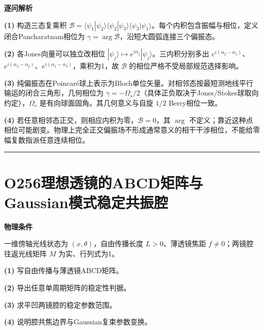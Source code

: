 \documentclass[UTF8,a4paper,11pt,oneside,openany]{ctexbook}
\begin{document}
\par\medskip\noindent\textbf{逐问解析}
\par\noindent\textbf{(1)} 构造三态复乘积 \(\mathcal B=\langle\psi_1|\psi_2\rangle\langle\psi_2|\psi_3\rangle\langle\psi_3|\psi_1\rangle\)。每个内积包含振幅与相位，定义闭合Pancharatnam相位为 \(\gamma=\arg\mathcal B\)，沿短大圆弧连接三个偏振态。
\par\noindent\textbf{(2)} 各Jones向量可以独立改相位 \(|\psi_j\rangle\mapsto e^{i\alpha_j}|\psi_j\rangle\)。三内积分别多出 \(e^{i(\alpha_2-\alpha_1)}\)、\(e^{i(\alpha_3-\alpha_2)}\)、\(e^{i(\alpha_1-\alpha_3)}\)，乘积为1，故 \(\mathcal B\) 的相位严格不受局部规范选择影响。
\par\noindent\textbf{(3)} 纯偏振态在Poincaré球上表示为Bloch单位矢量。对相邻态按最短测地线平行输运的闭合三角形，几何相位为 \(\gamma=-\Omega_s/2\)（具体正负取决于Jones/Stokes球取向约定），\(\Omega_s\) 是有向球面固角。其几何意义与自旋 \(1/2\) Berry相位一致。
\par\noindent\textbf{(4)} 若任意相邻态正交，则相应内积为零，\(\mathcal B=0\)，其 \(\arg\) 不定义；靠近这种点相位可能剧变。物理上完全正交偏振场不形成通常意义的相干干涉相位，不能给零幅复数指派任意连续相位。

\par\bigskip\hrule\bigskip
\section*{O256\quad 理想透镜的ABCD矩阵与Gaussian模式稳定共振腔}
\textbf{物理条件}\par 一维傍轴光线状态为 \((x,\theta)\)，自由传播长度 \(L>0\)、薄透镜焦距 \(f\ne0\)；两镜腔往返光线矩阵 \(M\) 为实、行列式为1。
\par\noindent\textbf{(1)} 写自由传播与薄透镜ABCD矩阵。
\par\noindent\textbf{(2)} 导出任意单周期矩阵的稳定性判据。
\par\noindent\textbf{(3)} 求平凹两镜腔的稳定参数范围。
\par\noindent\textbf{(4)} 说明腔共焦边界与Gaussian复束参数变换。
\end{document}
